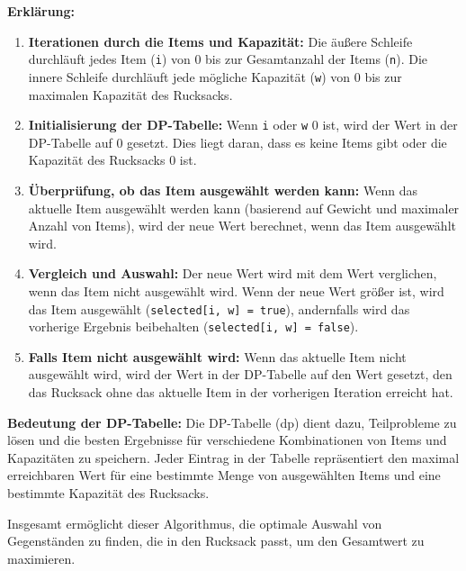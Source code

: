 \textbf{Erklärung:}
\begin{enumerate}
    \item \textbf{Iterationen durch die Items und Kapazität:} Die äußere Schleife durchläuft jedes Item
    (\texttt{i}) von 0 bis zur Gesamtanzahl der Items (\texttt{n}). Die innere Schleife durchläuft jede mögliche
    Kapazität (\texttt{w}) von 0 bis zur maximalen Kapazität des Rucksacks.

    \item \textbf{Initialisierung der DP-Tabelle:} Wenn \texttt{i} oder \texttt{w} 0 ist, wird der Wert in der
    DP-Tabelle auf 0 gesetzt. Dies liegt daran, dass es keine Items gibt oder die Kapazität des Rucksacks 0 ist.

    \item \textbf{Überprüfung, ob das Item ausgewählt werden kann:} Wenn das aktuelle Item ausgewählt werden
    kann (basierend auf Gewicht und maximaler Anzahl von Items), wird der neue Wert berechnet, wenn das Item
    ausgewählt wird.

    \item \textbf{Vergleich und Auswahl:} Der neue Wert wird mit dem Wert verglichen, wenn das Item nicht
    ausgewählt wird. Wenn der neue Wert größer ist, wird das Item ausgewählt (\texttt{selected[i, w] = true}),
    andernfalls wird das vorherige Ergebnis beibehalten (\texttt{selected[i, w] = false}).

    \item \textbf{Falls Item nicht ausgewählt wird:} Wenn das aktuelle Item nicht ausgewählt wird, wird der
    Wert in der DP-Tabelle auf den Wert gesetzt, den das Rucksack ohne das aktuelle Item in der vorherigen
    Iteration erreicht hat.\\
\end{enumerate}

\textbf{Bedeutung der DP-Tabelle:}
Die DP-Tabelle (dp) dient dazu, Teilprobleme zu lösen und die besten Ergebnisse für verschiedene Kombinationen
von Items und Kapazitäten zu speichern. Jeder Eintrag in der Tabelle repräsentiert den maximal erreichbaren Wert
für eine bestimmte Menge von ausgewählten Items und eine bestimmte Kapazität des Rucksacks.

Insgesamt ermöglicht dieser Algorithmus, die optimale Auswahl von Gegenständen zu finden, die in den Rucksack
passt, um den Gesamtwert zu maximieren.


